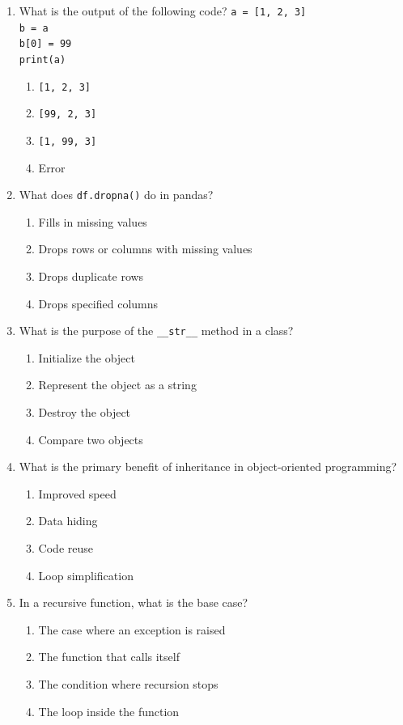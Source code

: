 \documentclass[12pt]{article}
\begin{document}
\begin{enumerate}[label=\arabic*.]

\item What is the output of the following code?  
\texttt{a = [1, 2, 3] \\
b = a \\
b[0] = 99 \\
print(a)}  
\begin{enumerate}[label=\Alph*.]
\item \texttt{[1, 2, 3]}  
\item \texttt{[99, 2, 3]}  
\item \texttt{[1, 99, 3]}  
\item Error
\end{enumerate}

\item What does \texttt{df.dropna()} do in pandas?  
\begin{enumerate}[label=\Alph*.]
\item Fills in missing values  
\item Drops rows or columns with missing values  
\item Drops duplicate rows  
\item Drops specified columns
\end{enumerate}

\item What is the purpose of the \texttt{\_\_str\_\_} method in a class?  
\begin{enumerate}[label=\Alph*.]
\item Initialize the object  
\item Represent the object as a string  
\item Destroy the object  
\item Compare two objects
\end{enumerate}

\item What is the primary benefit of inheritance in object-oriented programming?  
\begin{enumerate}[label=\Alph*.]
\item Improved speed  
\item Data hiding  
\item Code reuse  
\item Loop simplification
\end{enumerate}

\item In a recursive function, what is the base case?  
\begin{enumerate}[label=\Alph*.]
\item The case where an exception is raised  
\item The function that calls itself  
\item The condition where recursion stops  
\item The loop inside the function
\end{enumerate}


\end{enumerate}
\end{document}
